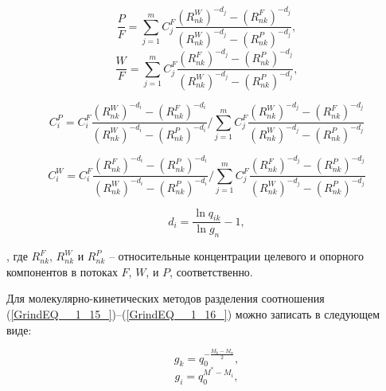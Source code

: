 \begin{equation} \label{GrindEQ__1_70_} 
  \frac{P}{F} =\sum _{j=1}^{m}C_{j}^{F} \frac{(R_{nk}^{W} )^{-d_{j} } -(R_{nk}^{F} )^{-d_{j} } }{(R_{nk}^{W} )^{-d_{j} } -(R_{nk}^{P} )^{-d_{j} } }  ,                                            
  \end{equation} 
  \begin{equation} \label{GrindEQ__1_71_} 
  \frac{W}{F} =\sum _{j=1}^{m}C_{j}^{F} \frac{(R_{nk}^{F} )^{-d_{j} } -(R_{nk}^{P} )^{-d_{j} } }{(R_{nk}^{W} )^{-d_{j} } -(R_{nk}^{P} )^{-d_{j} } }  ,                                        
\end{equation} 

\begin{equation} \label{GrindEQ__1_72_} 
  C_{i}^{P}=C_{i}^{F} \frac{\left(R_{n k}^{W}\right)^{-d_{i}}-\left(R_{n k}^{F}\right)^{-d_{i}}}{\left(R_{n k}^{W}\right)^{-d_{i}}-\left(R_{n k}^{P}\right)^{-d_{i}}} / \sum_{j=1}^{m} C_{j}^{F} \frac{\left(R_{n k}^{W}\right)^{-d_{j}}-\left(R_{n k}^{F}\right)^{-d_{j}}}{\left(R_{n k}^{W}\right)^{-d_{j}}-\left(R_{n k}^{P}\right)^{-d_{j}}}
\end{equation} 

\begin{equation} \label{GrindEQ__1_73_} 
  C_{i}^{W}=C_{i}^{F} \frac{\left(R_{n k}^{F}\right)^{-d_{i}}-\left(R_{n k}^{P}\right)^{-d_{i}}}{\left(R_{n k}^{W}\right)^{-d_{i}}-\left(R_{n k}^{P}\right)^{-d_{i}}} / \sum_{j=1}^{m} C_{j}^{F} \frac{\left(R_{n k}^{F}\right)^{-d_{j}}-\left(R_{n k}^{P}\right)^{-d_{j}}}{\left(R_{n k}^{W}\right)^{-d_{j}}-\left(R_{n k}^{P}\right)^{-d_{j}}}
\end{equation} 

\begin{equation} \label{GrindEQ__1_74_} 
  d_{i} =\frac{\ln q_{ik} }{\ln g_{n} } -1,              
\end{equation}

, где $R_{n k}^{F}$, $R_{n k}^{W}$ и $R_{n k}^{P}$ -- относительные концентрации целевого и опорного компонентов в потоках $F$, $W$, и $P$, соответственно.

Для молекулярно-кинетических методов разделения соотношения (\ref{GrindEQ__1_15_})--(\ref{GrindEQ__1_16_}) можно записать в следующем виде:

\begin{equation} \label{GrindEQ__1_75_} 
  g_{k} =q_{0}^{-\frac{M_{k} -M_{n} }{2} } ,        
  \end{equation} 
  \begin{equation} \label{GrindEQ__1_76_} 
  g_{i} =q_{0}^{M^{*} -M_{i} } ,        
\end{equation} 

